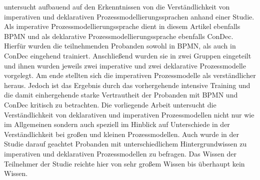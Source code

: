 \cite{pichler2012} untersucht aufbauend auf den Erkenntnissen von  \cite{fahland2009} die Verständlichkeit von imperativen und deklarativen Prozessmodellierungssprachen anhand einer Studie. Als imperative Prozessmodellierungssprache dient in diesem Artikel ebenfalls BPMN und als deklarative Prozessmodellierungssprache ebenfalls ConDec. \newline 
Hierfür wurden die teilnehmenden Probanden sowohl in BPMN, als auch in ConDec eingehend trainiert. Anschließend wurden sie in zwei Gruppen eingeteilt und ihnen wurden jeweils zwei imperative und zwei deklarative Prozessmodelle vorgelegt. Am ende stellten sich die imperativen Prozessmodelle als verständlicher heraus. Jedoch ist das Ergebnis durch das vorhergehende intensive Training und die damit einhergehende starke Vertrautheit der Probanden mit BPMN und ConDec kritisch zu betrachten. \newline
Die vorliegende Arbeit untersucht die Verständlichkeit von deklarativen und imperativen Prozessmodellen nicht nur wie \cite{pichler2012} im Allgemeinen sondern auch speziell im Hinblick auf Unterschiede in der Verständlichkeit bei großen und kleinen Prozessmodellen. Auch wurde in der Studie darauf geachtet Probanden mit unterschiedlichem Hintergrundwissen zu imperativen und deklarativen Prozessmodellen zu befragen. Das Wissen der Teilnehmer der Studie reichte hier von sehr großem Wissen bis überhaupt kein Wissen.\newline

